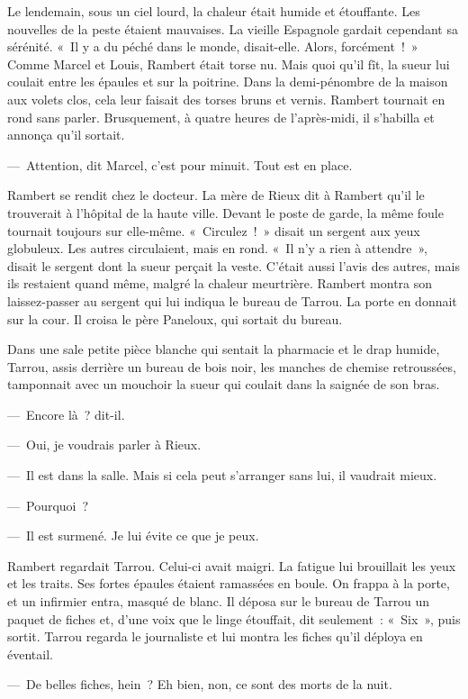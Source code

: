 \documentclass[french,twoside]{book} %
\begin{document}
Le lendemain, sous un ciel lourd, la chaleur était humide et étouffante. Les nouvelles de la peste étaient mauvaises. La vieille Espagnole gardait cependant sa sérénité. « Il y a du péché dans le monde, disait-elle. Alors, forcément ! » Comme Marcel et Louis, Rambert était torse nu. Mais quoi qu’il fît, la sueur lui coulait entre les épaules et sur la poitrine. Dans la demi-pénombre de la maison aux volets clos, cela leur faisait des torses bruns et vernis. Rambert tournait en rond sans parler. Brusquement, à quatre heures de l’après-midi, il s’habilla et annonça qu’il sortait.\par
— Attention, dit Marcel, c’est pour minuit. Tout est en place.\par
Rambert se rendit chez le docteur. La mère de Rieux dit à Rambert qu’il le trouverait à l’hôpital de la haute ville. Devant le poste de garde, la même foule tournait toujours sur elle-même. « Circulez ! » disait un sergent aux yeux globuleux. Les autres circulaient, mais en rond. « Il n’y a rien à attendre », disait le sergent dont la sueur perçait la veste. C’était aussi l’avis des autres, mais ils restaient quand même, malgré la chaleur meurtrière. Rambert montra son laissez-passer au sergent qui lui indiqua le bureau de Tarrou. La porte en donnait sur la cour. Il croisa le père Paneloux, qui sortait du bureau.\par
Dans une sale petite pièce blanche qui sentait la pharmacie et le drap humide, Tarrou, assis derrière un bureau de bois noir, les manches de chemise retroussées, tamponnait avec un mouchoir la sueur qui coulait dans la saignée de son bras.\par
— Encore là ? dit-il.\par
— Oui, je voudrais parler à Rieux.\par
— Il est dans la salle. Mais si cela peut s’arranger sans lui, il vaudrait mieux.\par
— Pourquoi ?\par
— Il est surmené. Je lui évite ce que je peux.\par
Rambert regardait Tarrou. Celui-ci avait maigri. La fatigue lui brouillait les yeux et les traits. Ses fortes épaules étaient ramassées en boule. On frappa à la porte, et un infirmier entra, masqué de blanc. Il déposa sur le bureau de Tarrou un paquet de fiches et, d’une voix que le linge étouffait, dit seulement : « Six », puis sortit. Tarrou regarda le journaliste et lui montra les fiches qu’il déploya en éventail.\par
— De belles fiches, hein ? Eh bien, non, ce sont des morts de la nuit.\par
\end{document}
